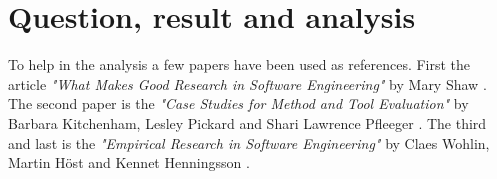\section{Question, result and analysis}
To help in the analysis a few papers have been used as references. First the
article {\em "What Makes Good Research in Software Engineering"} by Mary Shaw
\cite{shaw2002}. The second paper is the {\em "Case Studies for Method and Tool
Evaluation"} by Barbara Kitchenham, Lesley Pickard and Shari Lawrence Pfleeger
\cite{kitchenham1995}. The third and last is the {\em "Empirical Research in
Software Engineering"} by Claes Wohlin, Martin H\"{o}st and Kennet Henningsson
\cite{wohlin2003}.
